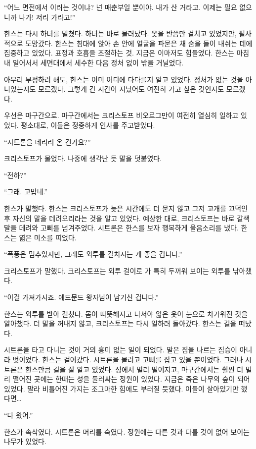 ``어느 면전에서 이러는 것이냐? 넌 매춘부일 뿐이야. 내가 산 거라고. 이제는 필요 없으니까 나가! 저리 가라고!''

한스는 다시 하녀를 밀쳤다. 하녀는 바로 물러났다. 옷을 반쯤만 걸치고 있었지만, 필사적으로 도망갔다. 한스는 침대에 앉아 손 안에 얼굴을 파묻은 채 숨을 들이 내쉬는 데에 집중하고 있었다. 표정과 호흡을 조절하는 것. 지금은 이마저도 힘들었다. 한스는 마침내 일어서서 세면대에서 세수한 다음 정처 없이 밖을 거닐었다.

아무리 부정하려 해도, 한스는 이미 어디에 다다를지 알고 있었다. 정처가 없는 것을 아니었는지도 모르겠다. 그렇게 긴 시간이 지났어도 여전히 가고 싶은 것인지도 모르겠다.

우선은 마구간으로. 마구간에서는 크리스토프 비오르그만이 여전히 열심히 일하고 있었다. 평소대로, 이들은 정중하게 인사를 주고받았다.

``시트론을 데리러 온 건가요?''

크리스토프가 물었다. 나중에 생각난 듯 말을 덧붙였다.

``전하?''

``그래. 고맙네.''

한스가 말했다. 한스는 크리스토프가 늦은 시간에도 더 묻지 않고 그저 고개를 끄덕인 후 자신의 말을 데려오리라는 것을 알고 있었다. 예상한 대로, 크리스토프는 바로 갈색 말을 데려와 고삐를 넘겨주었다. 시트론은 한스를 보자 행복하게 울음소리를 냈다. 한스는 엷은 미소를 띠었다.

``폭풍은 멈추었지만, 그래도 외투를 걸치시는 게 좋을 겁니다.''

크리스토프가 말했다. 크리스토프는 외투 걸이로 가 특히 두꺼워 보이는 외투를 낚아챘다.

``이걸 가져가시죠. 에드문드 왕자님이 남기신 겁니다.''

한스는 외투를 받아 걸쳤다. 몸이 따뜻해지고 나서야 얇은 옷이 눈으로 차가워진 것을 알아챘다. 더 말을 꺼내지 않고, 크리스토프는 다시 일하러 돌아갔다. 한스는 길을 떠났다.

시트론을 타고 다니는 것이 거의 흥미 없는 일이 되었다. 말은 짐을 나르는 짐승이 아니라 벗이었다. 한스는 걸어갔다. 시트론을 몰려고 고삐를 잡고 있을 뿐이었다. 그러나 시트론은 한스만큼 길을 잘 알고 있었다. 성에서 멀리 떨어지고, 마구간에서는 훨씬 더 멀리 떨어진 곳에는 한때는 성을 둘러싸는 정원이 있었다. 지금은 죽은 나무의 숲이 되어 있었다. 말라 비틀어진 가지는 조그마한 힘에도 부러질 듯했다. 이들이 살아있기만 했다면\ldots

``다 왔어.''

한스가 속삭였다. 시트론은 머리를 숙였다. 정원에는 다른 것과 다를 것이 없어 보이는 나무가 있었다.


